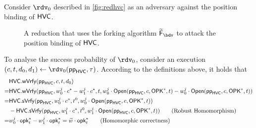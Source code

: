   Consider $\rdv_0$ described in \autoref{fig:redhvc} as an adversary against the position binding of $\mathsf{HVC}$.
  \begin{figure}\centering{}
  \caption{A reduction that uses the forking algorithm $\widetilde\fork_\bdv$ to attack the position binding of $\mathsf{HVC}$.}\label{fig:redhvc}
  \end{figure}
  To analyse the success probability of $\rdv_0$, consider an execution $(c,t,d_0,d_1)\gets\rdv_0(\hvcparams,\tau)$.
  According to the definitions above, it holds that
  \begin{align*}
    & \mathsf{HVC}.\mathsf{wVrfy}(\mathsf{pp}_{\mathsf{HVC}},c,t,d_0)\\
    =& \mathsf{HVC}.\mathsf{wVrfy}(\mathsf{pp}_{\mathsf{HVC}},w^j_0\cdot c^* - w^j_1\cdot c^*,t,w^j_0\cdot\mathsf{Open}(\mathsf{pp}_{\mathsf{HVC}},c,\mathsf{OPK}^*,t) - w^j_0\cdot\mathsf{Open}(\mathsf{pp}_{\mathsf{HVC}},c,\mathsf{OPK}^*,t))\\
    =& \mathsf{HVC}.\mathsf{sVrfy}(\mathsf{pp}_{\mathsf{HVC}},w^j_0\cdot c^*,t^0,w^j_0\cdot\mathsf{Open}(\mathsf{pp}_{\mathsf{HVC}},c,\mathsf{OPK}^*,t))\\ &- \mathsf{HVC}.\mathsf{sVrfy}(\mathsf{pp}_{\mathsf{HVC}},w^j_1\cdot c^*,t^0,w^j_1\cdot\mathsf{Open}(\mathsf{pp}_{\mathsf{HVC}},c,\mathsf{OPK}^*,t))
    \tag{Robust Homomorphism}\\
    =& w^j_0\cdot \mathsf{opk}^*_t - w^j_1\cdot \mathsf{opk}^*_t = \widetilde w\cdot \mathsf{opk}^*_t \tag{Homomorphic correctness}
  \end{align*}
